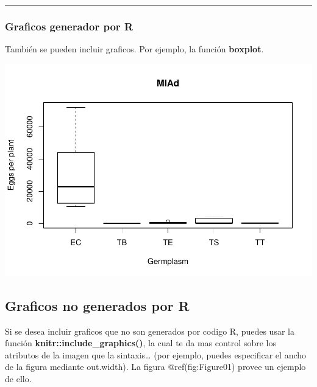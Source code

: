 \documentclass[]{article}
\newenvironment{Shaded}{\begin{snugshade}}{\end{snugshade}}
\newcommand{\DataTypeTok}[1]{\textcolor[rgb]{0.13,0.29,0.53}{#1}}
\newcommand{\KeywordTok}[1]{\textcolor[rgb]{0.13,0.29,0.53}{\textbf{#1}}}
\newcommand{\NormalTok}[1]{#1}
\newcommand{\OperatorTok}[1]{\textcolor[rgb]{0.81,0.36,0.00}{\textbf{#1}}}
\newcommand{\StringTok}[1]{\textcolor[rgb]{0.31,0.60,0.02}{#1}}
\begin{document}
\begin{center}\rule{0.5\linewidth}{\linethickness}\end{center}

\hypertarget{graficos-generador-por-r}{%
\subsubsection{Graficos generador por
R}\label{graficos-generador-por-r}}

También se pueden incluir graficos. Por ejemplo, la función
\textbf{boxplot}.

\begin{Shaded}
\end{Shaded}

\includegraphics{Post-en-archivo-RMD_files/figure-latex/pressure-1.pdf}

\hypertarget{graficos-no-generados-por-r}{%
\subsection{Graficos no generados por
R}\label{graficos-no-generados-por-r}}

Si se desea incluir graficos que no son generados por codigo R, puedes
usar la función \textbf{knitr::include\_graphics()}, la cual te da mas
control sobre los atributos de la imagen que la sintaxis\ldots{} (por
ejemplo, puedes especificar el ancho de la figura mediante out.width).
La figura @ref(fig:Figure01) provee un ejemplo de ello.
\end{document}
